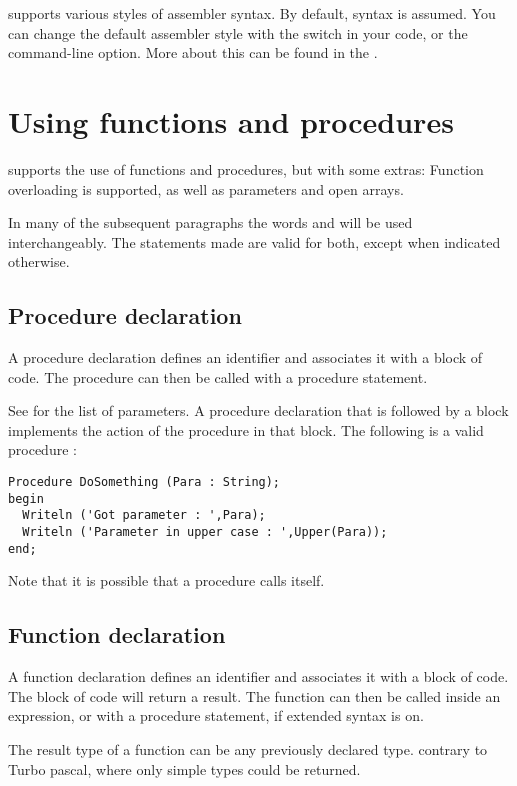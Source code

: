 \documentclass{report}
\begin{document}
\fpc supports various styles of assembler syntax. By default, 
syntax is assumed. You can change the default assembler style with the
 switch in your code, or the  command-line
option. More about this can be found in the \progref.


\chapter{Using functions and procedures}
\label{ch:Procedures}
\fpc supports the use of functions and procedures, but with some extras:
Function overloading is supported, as well as  parameters and
open arrays.

\begin{remark} In many of the subsequent paragraphs the words 
and  will be used interchangeably. The statements made are
valid for both, except when indicated otherwise.
\end{remark}

\section{Procedure declaration}
A procedure declaration defines an identifier and associates it with a
block of code. The procedure can then be called with a procedure statement.

See  for the list of parameters.
A procedure declaration that is followed by a block implements the action of
the procedure in that block.
The following is a valid procedure :
\begin{verbatim}
Procedure DoSomething (Para : String);
begin
  Writeln ('Got parameter : ',Para);
  Writeln ('Parameter in upper case : ',Upper(Para));
end;
\end{verbatim}
Note that it is possible that a procedure calls itself.

\section{Function declaration}
A function declaration defines an identifier and associates it with a
block of code. The block of code will return a result.
The function can then be called inside an expression, or with a procedure
statement, if extended syntax is on.

The result type of a function can be any previously declared type.
contrary to Turbo pascal, where only simple types could be returned.
\end{document}
